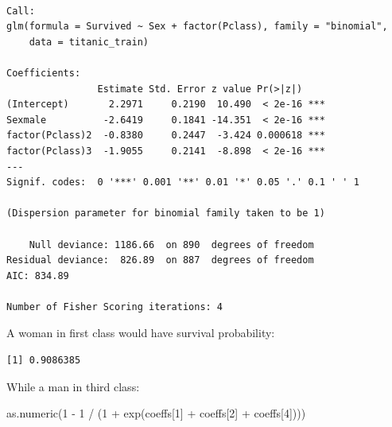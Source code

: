 \documentclass[
  letterpaper,
  DIV=11,
  numbers=noendperiod]{scrreprt}
\newenvironment{Shaded}{\begin{snugshade}}{\end{snugshade}}
\newcommand{\CommentTok}[1]{\textcolor[rgb]{0.37,0.37,0.37}{#1}}
\newcommand{\DecValTok}[1]{\textcolor[rgb]{0.68,0.00,0.00}{#1}}
\newcommand{\FunctionTok}[1]{\textcolor[rgb]{0.28,0.35,0.67}{#1}}
\newcommand{\NormalTok}[1]{\textcolor[rgb]{0.00,0.23,0.31}{#1}}
\newcommand{\OtherTok}[1]{\textcolor[rgb]{0.00,0.23,0.31}{#1}}
\newcommand{\SpecialCharTok}[1]{\textcolor[rgb]{0.37,0.37,0.37}{#1}}
\begin{document}
\begin{verbatim}

Call:
glm(formula = Survived ~ Sex + factor(Pclass), family = "binomial", 
    data = titanic_train)

Coefficients:
                Estimate Std. Error z value Pr(>|z|)    
(Intercept)       2.2971     0.2190  10.490  < 2e-16 ***
Sexmale          -2.6419     0.1841 -14.351  < 2e-16 ***
factor(Pclass)2  -0.8380     0.2447  -3.424 0.000618 ***
factor(Pclass)3  -1.9055     0.2141  -8.898  < 2e-16 ***
---
Signif. codes:  0 '***' 0.001 '**' 0.01 '*' 0.05 '.' 0.1 ' ' 1

(Dispersion parameter for binomial family taken to be 1)

    Null deviance: 1186.66  on 890  degrees of freedom
Residual deviance:  826.89  on 887  degrees of freedom
AIC: 834.89

Number of Fisher Scoring iterations: 4
\end{verbatim}

A woman in first class would have survival probability:

\begin{Shaded}
\end{Shaded}

\begin{verbatim}
[1] 0.9086385
\end{verbatim}

While a man in third class:

\begin{Shaded}
\begin{Highlighting}[]
\FunctionTok{as.numeric}\NormalTok{(}\DecValTok{1} \SpecialCharTok{{-}} \DecValTok{1} \SpecialCharTok{/}\NormalTok{ (}\DecValTok{1} \SpecialCharTok{+} \FunctionTok{exp}\NormalTok{(coeffs[}\DecValTok{1}\NormalTok{] }\SpecialCharTok{+}\NormalTok{ coeffs[}\DecValTok{2}\NormalTok{] }\SpecialCharTok{+}\NormalTok{ coeffs[}\DecValTok{4}\NormalTok{])))}
\end{Highlighting}
\end{Shaded}
\end{document}
